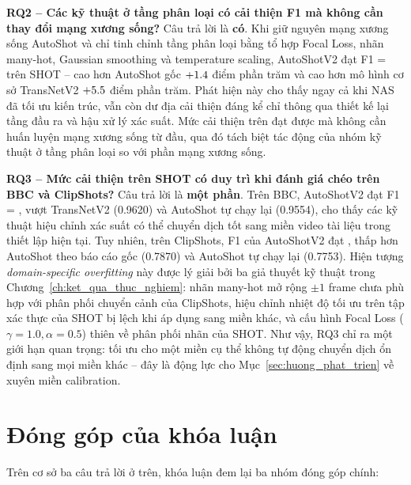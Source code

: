 \textbf{RQ2 -- Các kỹ thuật ở tầng phân loại có cải thiện F1 mà không cần thay đổi mạng xương sống?}
Câu trả lời là \textbf{có}. Khi giữ nguyên mạng xương sống AutoShot và chỉ tinh chỉnh tầng phân loại bằng tổ hợp Focal Loss, nhãn many-hot, Gaussian smoothing và temperature scaling, AutoShotV2 đạt F1 = \ASVTwoShotFOne{} trên SHOT -- cao hơn AutoShot gốc $+1.4$ điểm phần trăm và cao hơn mô hình cơ sở TransNetV2 $+5.5$ điểm phần trăm. Phát hiện này cho thấy ngay cả khi NAS đã tối ưu kiến trúc, vẫn còn dư địa cải thiện đáng kể chỉ thông qua thiết kế lại tầng đầu ra và hậu xử lý xác suất. Mức cải thiện trên đạt được mà không cần huấn luyện mạng xương sống từ đầu, qua đó tách biệt tác động của nhóm kỹ thuật ở tầng phân loại so với phần mạng xương sống.

\textbf{RQ3 -- Mức cải thiện trên SHOT có duy trì khi đánh giá chéo trên BBC và ClipShots?}
Câu trả lời là \textbf{một phần}. Trên BBC, AutoShotV2 đạt F1 = \ASVTwoBBCFOne, vượt TransNetV2 (0.9620) và AutoShot tự chạy lại (0.9554), cho thấy các kỹ thuật hiệu chỉnh xác suất có thể chuyển dịch tốt sang miền video tài liệu trong thiết lập hiện tại. Tuy nhiên, trên ClipShots, F1 của AutoShotV2 đạt \ASVTwoClipFOne, thấp hơn AutoShot theo báo cáo gốc (0.7870) và AutoShot tự chạy lại (0.7753). Hiện tượng \textit{domain-specific overfitting} này được lý giải bởi ba giả thuyết kỹ thuật trong Chương~\ref{ch:ket_qua_thuc_nghiem}: nhãn many-hot mở rộng $\pm 1$ frame chưa phù hợp với phân phối chuyển cảnh của ClipShots, hiệu chỉnh nhiệt độ tối ưu trên tập xác thực của SHOT bị lệch khi áp dụng sang miền khác, và cấu hình Focal Loss ($\gamma=1.0, \alpha=0.5$) thiên về phân phối nhãn của SHOT. Như vậy, RQ3 chỉ ra một giới hạn quan trọng: tối ưu cho một miền cụ thể không tự động chuyển dịch ổn định sang mọi miền khác -- đây là động lực cho Mục~\ref{sec:huong_phat_trien} về xuyên miền calibration.

\section{Đóng góp của khóa luận}

Trên cơ sở ba câu trả lời ở trên, khóa luận đem lại ba nhóm đóng góp chính:

